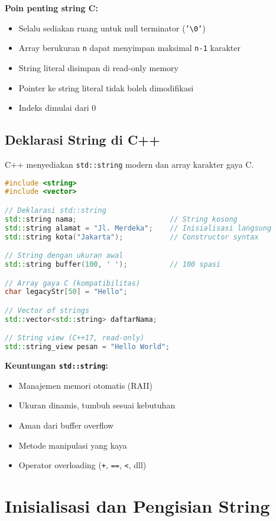 \documentclass[../main.tex]{subfiles}
\begin{document}
\textbf{Poin penting string C:}
\begin{itemize}
  \item Selalu sediakan ruang untuk null terminator (\texttt{'\textbackslash 0'})
  \item Array berukuran \texttt{n} dapat menyimpan maksimal \texttt{n-1} karakter
  \item String literal disimpan di read-only memory
  \item Pointer ke string literal tidak boleh dimodifikasi
  \item Indeks dimulai dari 0
\end{itemize}

\subsection{Deklarasi String di C++}

C++ menyediakan \texttt{std::string} modern dan array karakter gaya C.

\begin{lstlisting}[language=C++, caption={Deklarasi string di C++}]
#include <string>
#include <vector>

// Deklarasi std::string
std::string nama;                      // String kosong
std::string alamat = "Jl. Merdeka";    // Inisialisasi langsung
std::string kota("Jakarta");           // Constructor syntax

// String dengan ukuran awal
std::string buffer(100, ' ');          // 100 spasi

// Array gaya C (kompatibilitas)
char legacyStr[50] = "Hello";

// Vector of strings
std::vector<std::string> daftarNama;

// String view (C++17, read-only)
std::string_view pesan = "Hello World";
\end{lstlisting}

\textbf{Keuntungan \texttt{std::string}:}
\begin{itemize}
  \item Manajemen memori otomatis (RAII)
  \item Ukuran dinamis, tumbuh sesuai kebutuhan
  \item Aman dari buffer overflow
  \item Metode manipulasi yang kaya
  \item Operator overloading (\texttt{+}, \texttt{==}, \texttt{<}, dll)
\end{itemize}

\section{Inisialisasi dan Pengisian String}
\end{document}
